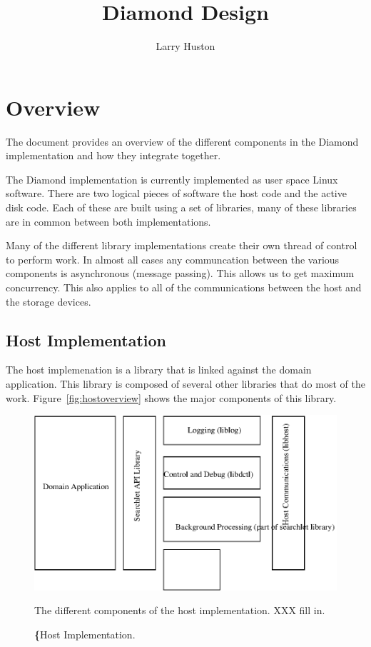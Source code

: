 \documentclass{article}
\title{Diamond Design}
\author{
  Larry Huston
}
\begin{document}
\maketitle


\section{Overview} \label{sec:overview}

The document provides an overview of the different components 
in the Diamond implementation and how they integrate together.

The Diamond implementation is currently implemented as user
space Linux software.   There are two logical pieces of
software the host code and the active disk code.  Each of these
are built using a set of libraries, many of these libraries are
in common between both implementations.

Many of the different library implementations create their
own thread of control to perform work.  In almost all
cases any communcation between the various components
is asynchronous (message passing).  This allows us
to get maximum concurrency.  This also applies to all
of the communications between the host and the storage devices.


\subsection{Host Implementation}

The host implemenation is a library that is linked against the domain
application.  This library is composed of several other libraries
that do most of the work.  Figure~\ref{fig:hostoverview} shows
the major components of this library.

\begin{figure}[tbp]
\begin{center}
\includegraphics[width=\linewidth]{pics/host_structure}%
\end{center}
\caption{\textbf\{Host Implementation.}
The different components of the host implementation.
XXX fill in.
\label{fig:hostoeverview}
\end{figure}
                                                                                
\end{document}
